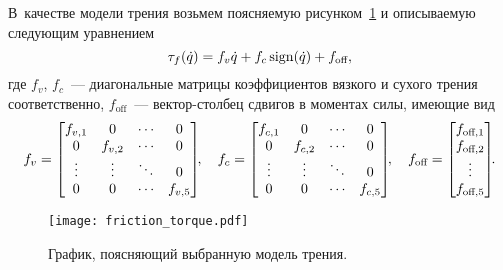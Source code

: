 В~качестве модели трения возьмем поясняемую рисунком~\ref{img_friction_torque} и описываемую следующим уравнением
\begin{equation}\label{eq_friction_torque}
    \tau_f(\dot{q}) = f_v \dot{q} + f_c \operatorname{sign}(\dot{q}) + f_\text{off},
\end{equation}
где $f_v$, $f_c$~--- диагональные матрицы коэффициентов вязкого и сухого трения соответственно, $f_\text{off}$~--- вектор-столбец сдвигов в моментах силы, имеющие вид
\begin{equation}
    f_v =
    \begin{bmatrix}
        f_{v,1} & 0 & \cdots & 0 \\
        0 & f_{v,2} & \cdots & 0 \\
        \vdots & \vdots & \ddots & 0 \\
        0 & 0 & \cdots & f_{v,5}
    \end{bmatrix}\!\!,
    \quad
    f_c =
    \begin{bmatrix}
        f_{c,1} & 0 & \cdots & 0 \\
        0 & f_{c,2} & \cdots & 0 \\
        \vdots & \vdots & \ddots & 0 \\
        0 & 0 & \cdots & f_{c,5}
    \end{bmatrix}\!\!,
    \quad
    f_\text{off} =
    \begin{bmatrix}
        f_{\text{off},1} \\ f_{\text{off},2} \\ \vdots \\ f_{\text{off},5}
    \end{bmatrix}\!\!\ldotp
\end{equation}

\begin{figure}[h!]
	\centering\texttt{[image: friction\_torque.pdf]}
	\caption{График, поясняющий выбранную модель трения.}
	\label{img_friction_torque}
\end{figure}

